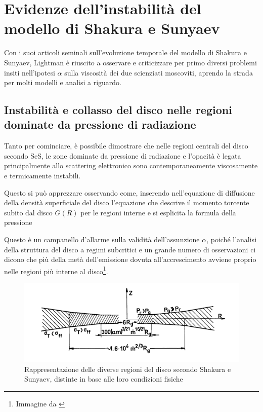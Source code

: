 \documentclass[a4paperbi]{article}
\begin{document}
\newpage
\section{Evidenze dell'instabilità del modello di Shakura e Sunyaev}
	Con i suoi articoli seminali sull'evoluzione temporale del modello di Shakura e Sunyaev, Lightman è riuscito a osservare e criticizzare per primo diversi problemi insiti nell'ipotesi $\alpha$ sulla viscosità dei due scienziati moscoviti, aprendo la strada per molti modelli e analisi a riguardo.
	
	\subsection{Instabilità e collasso del disco nelle regioni dominate da pressione di radiazione}
	Tanto per cominciare, è possibile dimostrare che nelle regioni centrali del disco secondo SeS, le zone dominate da pressione di radiazione e l'opacità è legata principalmente allo scattering elettronico sono contemporaneamente viscosamente e termicamente instabili.
	
	Questo si può apprezzare osservando come, inserendo nell'equazione di diffusione della densità superficiale del disco l'equazione che descrive il momento torcente subito dal disco $G(R)$ per le regioni interne e si esplicita la formula della pressione	
	
	Questo è un campanello d'allarme sulla validità dell'assunzione $\alpha$, poiché l'analisi della struttura del disco a regimi subcritici e un grande numero di osservazioni ci dicono che più della metà dell'emissione dovuta all'accrescimento avviene proprio nelle regioni più interne al disco\footnote{Immagine da \cite{ShakuraSunyaev1973}}.
		
	\begin{figure}[H]
		\centering
		\includegraphics[width=0.9\linewidth]{RegioniDisco}
		\caption{Rappresentazione delle diverse regioni del disco secondo Shakura e Sunyaev, distinte in base alle loro condizioni fisiche}
		\label{fig:RegioniDisco}
	\end{figure}	
	
\end{document}
